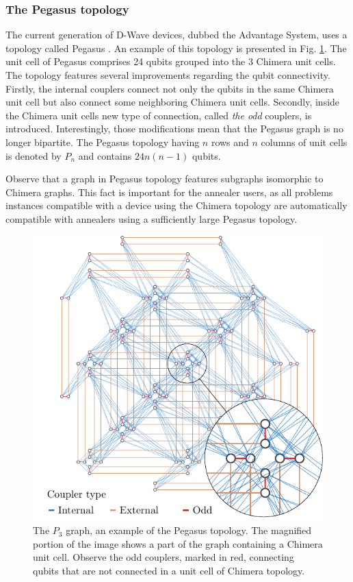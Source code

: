 \subsubsection{The Pegasus topology}
The current generation of D-Wave devices, dubbed the Advantage System, uses a
topology called Pegasus \cite{boothby}. An example of this topology is
presented in Fig. \ref{fig:pegasus}. The unit cell of Pegasus comprises 24
qubits grouped into the 3 Chimera unit cells. The topology features several
improvements regarding the qubit connectivity. Firstly, the internal couplers
connect not only the qubits in the same Chimera unit cell but also connect some
neighboring Chimera unit cells. Secondly, inside the Chimera unit cells new
type of connection, called \emph{the odd} couplers, is introduced.
Interestingly, those modifications mean that the Pegasus graph is no longer
bipartite. The Pegasus topology having $n$ rows and $n$ columns of unit cells
is denoted by $P_n$ and contains $24n(n-1)$ qubits.

Observe that a graph in Pegasus topology features subgraphs isomorphic to
Chimera graphs. This fact is important for the annealer users, as all problems
instances compatible with a device using the Chimera topology are automatically
compatible with annealers using a sufficiently large Pegasus topology.

\begin{figure}
  \includegraphics[width=\textwidth]{figures/pegasus}
  \caption{
    The $P_3$ graph, an example of the Pegasus topology. The magnified portion of
    the image shows a part of the graph containing a Chimera unit cell. Observe the
    odd couplers, marked in red, connecting qubits that are not connected in a unit
    cell of Chimera topology. } \label{fig:pegasus}
\end{figure}

